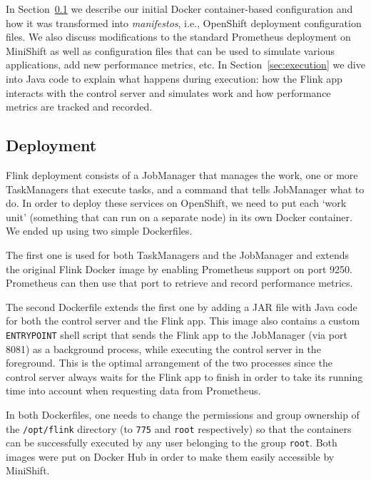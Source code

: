 \documentclass{article}
\begin{document}
In Section~\ref{sec:deployment} we describe our initial Docker
container-based configuration and how it was transformed into \emph{manifestos},
i.e., OpenShift deployment configuration files. We also discuss modifications to
the standard Prometheus deployment on MiniShift as well as configuration files
that can be used to simulate various applications, add new performance metrics,
etc. In Section~\ref{sec:execution} we dive into Java code to explain what
happens during execution: how the Flink app interacts with the control server
and simulates work and how performance metrics are tracked and recorded.

\subsection{Deployment} \label{sec:deployment}

Flink deployment consists of a JobManager that manages the work, one or more
TaskManagers that execute tasks, and a command that tells JobManager what to do.
In order to deploy these services on OpenShift, we need to put each `work unit'
(something that can run on a separate node) in its own Docker container. We
ended up using two simple Dockerfiles.

The first one is used for both TaskManagers and the JobManager and extends the
original Flink Docker image by enabling Prometheus support on port 9250.
Prometheus can then use that port to retrieve and record performance metrics.

The second Dockerfile extends the first one by adding a JAR file with Java code
for both the control server and the Flink app. This image also contains a custom
\texttt{ENTRYPOINT} shell script that sends the Flink app to the JobManager (via
port 8081) as a background process, while executing the control server in the
foreground. This is the optimal arrangement of the two processes since the
control server always waits for the Flink app to finish in order to take its
running time into account when requesting data from Prometheus.

In both Dockerfiles, one needs to change the permissions and group ownership of the
\texttt{/opt/flink} directory (to \texttt{775} and \texttt{root} respectively)
so that the containers can be successfully executed by any user belonging to the
group \texttt{root}. Both images were put on Docker Hub in order to make them
easily accessible by MiniShift.
\end{document}
